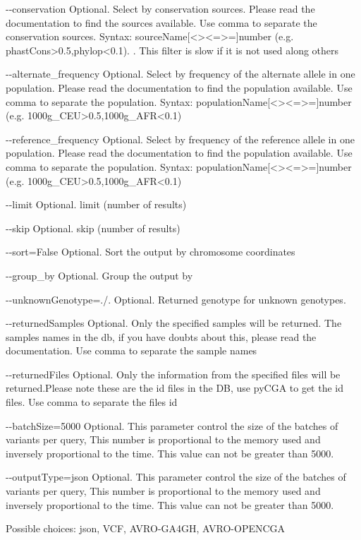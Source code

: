 \documentclass[letterpaper,10pt,english]{sphinxmanual}
\begin{document}
\begin{description}
\begin{optionlist}{3cm}
\item [-{-}conservation]  
Optional. Select by conservation sources. Please read the documentation to find the sources available. Use comma to separate the conservation sources. Syntax: sourceName{[}\textless{}\textbar{}\textgreater{}\textbar{}\textless{}=\textbar{}\textgreater{}={]}number (e.g. phastCons\textgreater{}0.5,phylop\textless{}0.1). . This filter is slow if it is not used along others
\item [-{-}alternate\_frequency]  
Optional. Select by frequency of the alternate allele in one population. Please read the documentation to find the population available. Use comma to separate the population. Syntax: populationName{[}\textless{}\textbar{}\textgreater{}\textbar{}\textless{}=\textbar{}\textgreater{}={]}number (e.g. 1000g\_CEU\textgreater{}0.5,1000g\_AFR\textless{}0.1)
\item [-{-}reference\_frequency]  
Optional. Select by frequency of the reference allele in one population. Please read the documentation to find the population available. Use comma to separate the population. Syntax: populationName{[}\textless{}\textbar{}\textgreater{}\textbar{}\textless{}=\textbar{}\textgreater{}={]}number (e.g. 1000g\_CEU\textgreater{}0.5,1000g\_AFR\textless{}0.1)
\item [-{-}limit]  
Optional. limit (number of results)
\item [-{-}skip]  
Optional. skip (number of results)
\item [-{-}sort=False]  
Optional. Sort the output by chromosome coordinates
\item [-{-}group\_by]  
Optional. Group the output by 
\item [-{-}unknownGenotype=./.]  
Optional. Returned genotype for unknown genotypes. 
\item [-{-}returnedSamples]  
Optional. Only the specified samples will be returned. The samples names in the db, if you have doubts about this, please read the documentation. Use comma to separate the sample names
\item [-{-}returnedFiles]  
Optional. Only the information from the specified files will be returned.Please note these are the id files in the DB, use pyCGA to get the id files. Use comma to separate the files id
\item [-{-}batchSize=5000]  
Optional. This parameter control the size of the batches of variants per query, This number is proportional to the memory used and inversely proportional to the time. This value can not be greater than 5000.
\item [-{-}outputType=json]  
Optional. This parameter control the size of the batches of variants per query, This number is proportional to the memory used and inversely proportional to the time. This value can not be greater than 5000.

Possible choices: json, VCF, AVRO-GA4GH, AVRO-OPENCGA
\end{optionlist}

\end{description}
\end{document}

